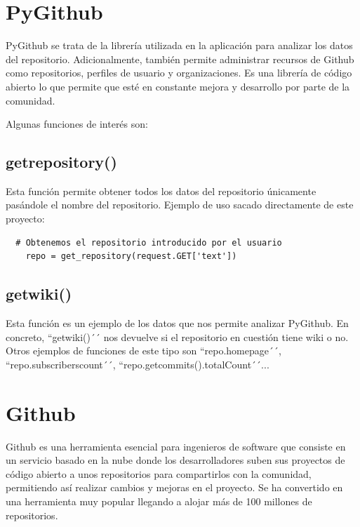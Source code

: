 \documentclass[a4paper, 12pt]{book}
\begin{document}
\section{PyGithub}
\label{sec:pygithub}

PyGithub\cite{website:Pygithub} se trata de la librería utilizada en la aplicación para analizar los datos del repositorio. Adicionalmente, también permite administrar recursos de Github como repositorios, perfiles de usuario y organizaciones. Es una librería de código abierto lo que permite que esté en constante mejora y desarrollo por parte de la comunidad. 

Algunas funciones de interés son:

\subsection{get\textunderscore repository()}

Esta función permite obtener todos los datos del repositorio únicamente pasándole el nombre del repositorio. Ejemplo de uso sacado directamente de este proyecto:

 {\footnotesize
\begin{verbatim}
  # Obtenemos el repositorio introducido por el usuario
    repo = get_repository(request.GET['text'])
\end{verbatim}
}

\subsection{get\textunderscore wiki()}

Esta función es un ejemplo de los datos que nos permite analizar PyGithub. En concreto, ``getwiki()´´ nos devuelve si el repositorio en cuestión tiene wiki o no. Otros ejemplos de funciones de este tipo son ``repo.homepage´´, ``repo.subscriberscount´´, ``repo.getcommits().totalCount´´...

\section{Github}
\label{sec:github}

Github es una herramienta esencial para ingenieros de software que consiste en un servicio basado en la nube donde los desarrolladores suben sus proyectos de código abierto a unos repositorios para compartirlos con la comunidad, permitiendo así realizar cambios y mejoras en el proyecto. Se ha convertido en una herramienta muy popular llegando a alojar más de 100 millones de repositorios.
\end{document}
